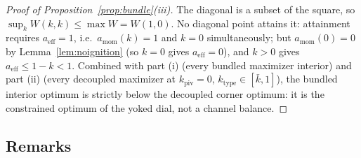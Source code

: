 \begin{proof}[Proof of Proposition~\ref{prop:bundle}(iii)]
The diagonal is a subset of the square, so $\sup_k W(k,k)\le\max W=W(1,0)$. No diagonal point
attains it: attainment requires $a_{\mathrm{eff}}=1$, i.e.\ $a_{\mathrm{mom}}(k)=1$ and $k=0$
simultaneously; but $a_{\mathrm{mom}}(0)=0$ by Lemma~\ref{lem:noignition} (so $k=0$ gives
$a_{\mathrm{eff}}=0$), and $k>0$ gives $a_{\mathrm{eff}}\le 1-k<1$. Combined with part (i)
(every bundled maximizer interior) and part (ii) (every decoupled maximizer at
$k_{\mathrm{piv}}=0$, $k_{\mathrm{type}}\in[\bar k,1]$), the bundled interior optimum is
strictly below the decoupled corner optimum: it is the constrained optimum of the yoked dial,
not a channel balance.
\end{proof}

\subsection*{Remarks}

